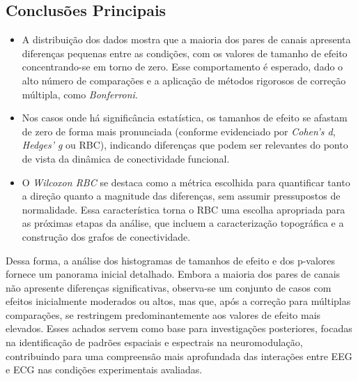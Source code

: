 \subsection{Conclusões Principais}
\begin{itemize}
    \item A distribuição dos dados mostra que a maioria dos pares de canais apresenta diferenças pequenas entre as condições, com os valores de tamanho de efeito concentrando-se em torno de zero. Esse comportamento é esperado, dado o alto número de comparações e a aplicação de métodos rigorosos de correção múltipla, como \textit{Bonferroni}.
    
    \item Nos casos onde há significância estatística, os tamanhos de efeito se afastam de zero de forma mais pronunciada (conforme evidenciado por \textit{Cohen's d}, \textit{Hedges' g} ou RBC), indicando diferenças que podem ser relevantes do ponto de vista da dinâmica de conectividade funcional.

    \item O \textit{Wilcoxon RBC} se destaca como a métrica escolhida para quantificar tanto a direção quanto a magnitude das diferenças, sem assumir pressupostos de normalidade. Essa característica torna o RBC uma escolha apropriada para as próximas etapas da análise, que incluem a caracterização topográfica e a construção dos grafos de conectividade.

\end{itemize}

Dessa forma, a análise dos histogramas de tamanhos de efeito e dos p-valores fornece um panorama inicial detalhado. Embora a maioria dos pares de canais não apresente diferenças significativas, observa-se um conjunto de casos com efeitos inicialmente moderados ou altos, mas que, após a correção para múltiplas comparações, se restringem predominantemente aos valores de efeito mais elevados. Esses achados servem como base para investigações posteriores, focadas na identificação de padrões espaciais e espectrais na neuromodulação, contribuindo para uma compreensão mais aprofundada das interações entre EEG e ECG nas condições experimentais avaliadas.
